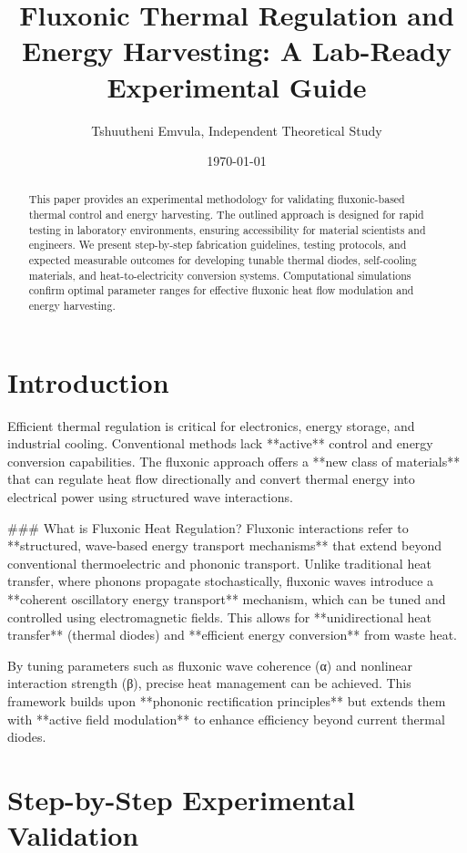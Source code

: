 \documentclass{article}
\title{Fluxonic Thermal Regulation and Energy Harvesting: A Lab-Ready Experimental Guide}
\author{Tshuutheni Emvula, Independent Theoretical Study}
\date{\today}
\begin{document}
\maketitle

\begin{abstract}
This paper provides an experimental methodology for validating fluxonic-based thermal control and energy harvesting. The outlined approach is designed for rapid testing in laboratory environments, ensuring accessibility for material scientists and engineers. We present step-by-step fabrication guidelines, testing protocols, and expected measurable outcomes for developing tunable thermal diodes, self-cooling materials, and heat-to-electricity conversion systems. Computational simulations confirm optimal parameter ranges for effective fluxonic heat flow modulation and energy harvesting.
\end{abstract}

\section{Introduction}
Efficient thermal regulation is critical for electronics, energy storage, and industrial cooling. Conventional methods lack **active** control and energy conversion capabilities. The fluxonic approach offers a **new class of materials** that can regulate heat flow directionally and convert thermal energy into electrical power using structured wave interactions. 

### What is Fluxonic Heat Regulation?
Fluxonic interactions refer to **structured, wave-based energy transport mechanisms** that extend beyond conventional thermoelectric and phononic transport. Unlike traditional heat transfer, where phonons propagate stochastically, fluxonic waves introduce a **coherent oscillatory energy transport** mechanism, which can be tuned and controlled using electromagnetic fields. This allows for **unidirectional heat transfer** (thermal diodes) and **efficient energy conversion** from waste heat.

By tuning parameters such as fluxonic wave coherence (α) and nonlinear interaction strength (β), precise heat management can be achieved. This framework builds upon **phononic rectification principles** but extends them with **active field modulation** to enhance efficiency beyond current thermal diodes.

\section{Step-by-Step Experimental Validation}
\end{document}

